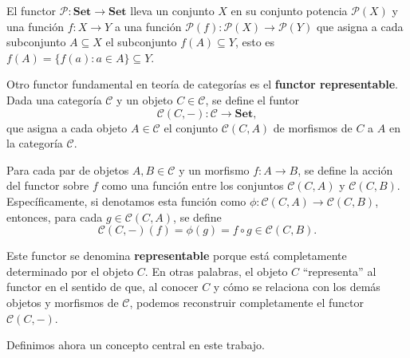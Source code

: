 \begin{ejemplo}
    El functor $\mathcal{P}: \textbf{Set} \longrightarrow \textbf{Set}$ lleva un conjunto $X$ en su conjunto potencia $\mathcal{P}(X)$ y una función $f: X \longrightarrow Y$ a una función $\mathcal{P}(f): \mathcal{P}(X) \longrightarrow \mathcal{P}(Y)$ que asigna a cada subconjunto $A \subseteq X$ el subconjunto $f(A) \subseteq Y$, esto es $f(A) = \{f(a) : a \in A\} \subseteq Y$.
    \label{ejemplo:potencia}
\end{ejemplo}

\begin{ejemplo}
    Otro functor fundamental en teoría de categorías es el \textbf{functor representable}. Dada una categoría $\mathscr{C}$ y un objeto $C \in \mathscr{C}$, se define el funtor
    \begin{equation}
        \mathscr{C}(C, -): \mathscr{C} \longrightarrow \mathbf{Set},
    \end{equation}
    que asigna a cada objeto $A \in \mathscr{C}$ el conjunto $\mathscr{C}(C, A)$ de morfismos de $C$ a $A$ en la categoría $\mathscr{C}$. 

    Para cada par de objetos $A, B \in \mathscr{C}$ y un morfismo $f: A \longrightarrow B$, se define la acción del functor sobre $f$ como una función entre los conjuntos $\mathscr{C}(C, A)$ y $\mathscr{C}(C, B)$. Específicamente, si denotamos esta función como $\phi: \mathscr{C}(C, A) \longrightarrow \mathscr{C}(C, B)$, entonces, para cada $g \in \mathscr{C}(C, A)$, se define
    $$
    \mathscr{C}(C,-)(f) = \phi(g) = f \circ g \in \mathscr{C}(C, B).
    $$

    Este functor se denomina \textbf{representable} porque está completamente determinado por el objeto $C$. En otras palabras, el objeto $C$ ``representa'' al functor en el sentido de que, al conocer $C$ y cómo se relaciona con los demás objetos y morfismos de $\mathscr{C}$, podemos reconstruir completamente el functor $\mathscr{C}(C, -)$. 
    \label{ej:func_repre}
\end{ejemplo}

Definimos ahora un concepto central en este trabajo.

